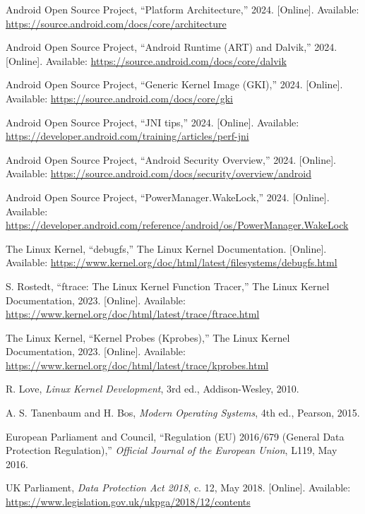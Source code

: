 \documentclass[a4paper,12pt]{report}
\begin{document}
\begin{thebibliography}{99}
Android Open Source Project, “Platform Architecture,” 2024. [Online]. Available: \url{https://source.android.com/docs/core/architecture}

Android Open Source Project, “Android Runtime (ART) and Dalvik,” 2024. [Online]. Available: \url{https://source.android.com/docs/core/dalvik}

Android Open Source Project, “Generic Kernel Image (GKI),” 2024. [Online]. Available: \url{https://source.android.com/docs/core/gki}

Android Open Source Project, “JNI tips,” 2024. [Online]. Available: \url{https://developer.android.com/training/articles/perf-jni}

Android Open Source Project, “Android Security Overview,” 2024. [Online]. Available: \url{https://source.android.com/docs/security/overview/android}

Android Open Source Project, “PowerManager.WakeLock,” 2024. [Online]. Available: \url{https://developer.android.com/reference/android/os/PowerManager.WakeLock}

The Linux Kernel, “debugfs,” The Linux Kernel Documentation. [Online]. Available: \url{https://www.kernel.org/doc/html/latest/filesystems/debugfs.html}

S. Rostedt, “ftrace: The Linux Kernel Function Tracer,” The Linux Kernel Documentation, 2023. [Online]. Available: \url{https://www.kernel.org/doc/html/latest/trace/ftrace.html}

The Linux Kernel, “Kernel Probes (Kprobes),” The Linux Kernel Documentation, 2023. [Online]. Available: \url{https://www.kernel.org/doc/html/latest/trace/kprobes.html}

R. Love, \emph{Linux Kernel Development}, 3rd ed., Addison-Wesley, 2010.

A. S. Tanenbaum and H. Bos, \emph{Modern Operating Systems}, 4th ed., Pearson, 2015.

European Parliament and Council, “Regulation (EU) 2016/679 (General Data Protection Regulation),” \emph{Official Journal of the European Union}, L119, May 2016.

UK Parliament, \emph{Data Protection Act 2018}, c. 12, May 2018. [Online]. Available: \url{https://www.legislation.gov.uk/ukpga/2018/12/contents}

\end{thebibliography}
\end{document}
